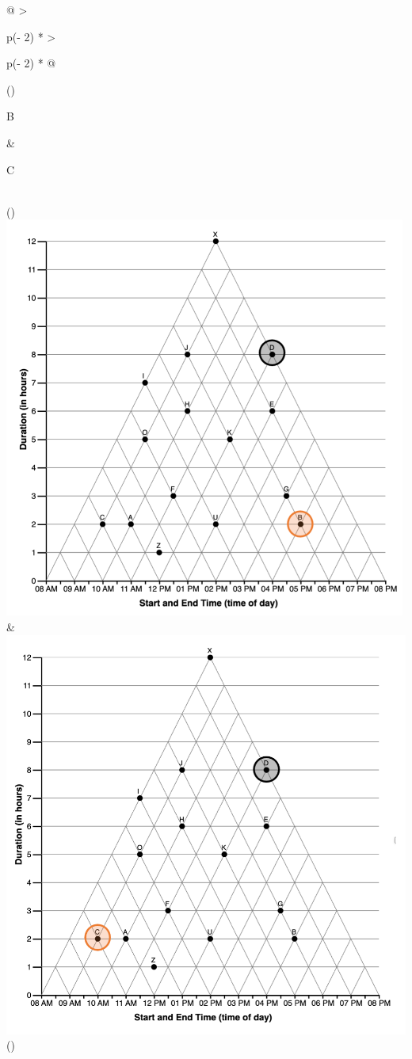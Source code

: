 \documentclass[
  letterpaper,
  DIV=11,
  numbers=noendperiod]{scrreprt}
\begin{document}
\begin{longtable}[]{@{}
  >{\raggedright\arraybackslash}p{(\columnwidth - 2\tabcolsep) * }
  >{\raggedright\arraybackslash}p{(\columnwidth - 2\tabcolsep) * }@{}}
\toprule()
\begin{minipage}[b]{\linewidth}\raggedright
B
\end{minipage} & \begin{minipage}[b]{\linewidth}\raggedright
C
\end{minipage} \\
\midrule()
\endhead
\includegraphics[width=5.20833in,height=\textheight]{analysis/SGC3A/static/interpretations/Q2_111_B.png}
&
\includegraphics{analysis/SGC3A/static/interpretations/Q2_111_C.png} \\
\bottomrule()
\end{longtable}
\end{document}
